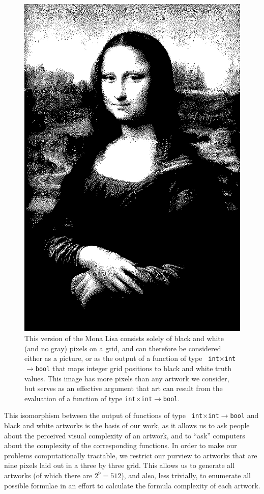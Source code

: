 \documentclass[11pt]{article}
\begin{document}
\begin{figure} 
\begin{center} 
\includegraphics[width=5in]{monalisa_mono.jpg}
\end{center} 
\caption{This version of the Mona Lisa consists solely of black
and white (and no gray) pixels on a grid, and can therefore be considered
either as a picture, or as the output of a function of type {\tt
int$\times$int$\to$bool} that maps integer grid positions to black and white
truth values.  This image has more pixels than any artwork we consider, but
serves as an effective argument that art can result from the evaluation of a
function of type {\tt int$\times$int$\to$bool}.}
\label{fig:monalisa} 
\end{figure}

This isomorphism between the output of functions of type {\tt
int$\times$int$\to$bool} and black and white artworks is the basis of our work,
as it allows us to ask people about the perceived visual complexity of an
artwork, and to ``ask'' computers about the complexity of the corresponding
functions.  In order to make our problems computationally tractable, we
restrict our purview to artworks that are nine pixels laid out in a three by
three grid.  This allows us to generate all artworks (of which there are
$2^9=512$), and also, less trivially, to enumerate all possible formulae in an
effort to calculate the formula complexity of each artwork.
\end{document}
